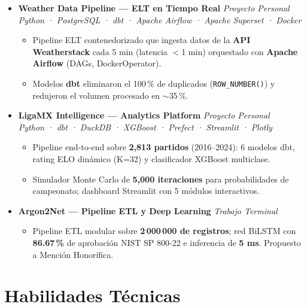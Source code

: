\documentclass[a4paper,10pt]{article}
\begin{document}
\begin{itemize}

  \item \textbf{Weather Data Pipeline --- ELT en Tiempo Real} \hfill \textit{Proyecto Personal}\\
        \textit{Python · PostgreSQL · dbt · Apache Airflow · Apache Superset · Docker}
        \begin{itemize}
          \item Pipeline ELT contenedorizado que ingesta datos de la \textbf{API Weatherstack}
                cada 5 min (latencia $<$1 min) orquestado con \textbf{Apache Airflow} (DAGs, DockerOperator).
          \item Modelos \textbf{dbt} eliminaron el 100\,\% de duplicados (\texttt{ROW\_NUMBER()})
                y redujeron el volumen procesado en $\sim$35\,\%.
        \end{itemize}

  \item \textbf{LigaMX Intelligence --- Analytics Platform} \hfill \textit{Proyecto Personal}\\
        \textit{Python · dbt · DuckDB · XGBoost · Prefect · Streamlit · Plotly}
        \begin{itemize}
          \item Pipeline end-to-end sobre \textbf{2,813 partidos} (2016--2024): 6 modelos dbt,
                rating ELO din\'{a}mico (K=32) y clasificador XGBoost multiclase.
          \item Simulador Monte Carlo de \textbf{5,000 iteraciones} para probabilidades de
                campeonato; dashboard Streamlit con 5 m\'{o}dulos interactivos.
        \end{itemize}

  \item \textbf{Argon2Net --- Pipeline ETL y Deep Learning} \hfill \textit{Trabajo Terminal}
        \begin{itemize}
          \item Pipeline ETL modular sobre \textbf{2\,000\,000 de registros}; red BiLSTM con
                \textbf{86.67\,\%} de aprobaci\'{o}n NIST SP 800-22 e inferencia de \textbf{5 ms}.
                Propuesto a Menci\'{o}n Honor\'{i}fica.
        \end{itemize}
\end{itemize}

\section{Habilidades T\'{e}cnicas}
\end{document}
